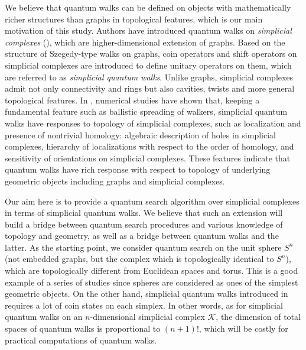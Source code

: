 \documentclass[a4paper,12pt]{article}
\numberwithin{equation}{section}
\begin{document}
%
\par
We believe that quantum walks can be defined on objects with mathematically richer structures than graphs in topological features, which is our main motivation of this study. 
Authors have introduced quantum walks on {\em simplicial complexes} (\cite{MOSver1}), which are higher-dimensional extension of graphs.
Based on the structure of Szegedy-type walks on graphs, coin operators and shift operators on simplicial complexes are introduced to define unitary operators on them, which are referred to as {\em simplicial quantum walks}. 
Unlike graphs, simplicial complexes admit not only connectivity and rings but also cavities, twists and more general topological features. 
In \cite{MOSver1}, numerical studies have shown that, keeping a fundamental feature such as ballistic spreading of walkers, simplicial quantum walks have responses to topology of simplicial complexes, such as localization and presence of nontrivial homology: algebraic description of holes in simplicial complexes, hierarchy of localizations with respect to the order of homology, and sensitivity of orientations on simplicial complexes. 
These features indicate that quantum walks have rich response with respect to topology of underlying geometric objects including graphs and simplicial complexes.
\par
\bigskip
Our aim here is to provide a quantum search algorithm over simplicial complexes in terms of simplicial quantum walks.
We believe that such an extension will build a bridge between quantum search procedures and various knowledge of topology and geometry, as well as a bridge between quantum walks and the latter.
As the starting point, we consider quantum search on the unit sphere $S^n$ (not embedded graphs, but the complex which is topologically identical to $S^n$), which are topologically different from Euclidean spaces and torus.
This is a good example of a series of studies since spheres are considered as ones of the simplest geometric objects.
On the other hand, simplicial quantum walks introduced in \cite{MOSver1} requires a lot of coin states on each simplex. 
In other words, as for simplicial quantum walks on an $n$-dimensional simplicial complex $\mathcal{K}$, the dimension of total spaces of quantum walks is proportional to $(n+1)!$, which will be costly for practical computations of quantum walks.
\end{document}
